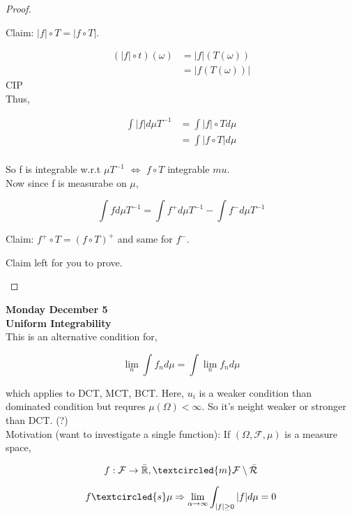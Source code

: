 \documentclass[11pt,fleqn]{book} %
\begin{document}
\begin{proof}
\begin{enumerate}
					Claim: $|f| \circ T = |f \circ T|$. 

							$$\begin{aligned}
								(|f| \circ t)(\omega) &= |f|(T(\omega))\\
									&=|f(T(\omega))|
							\end{aligned} $$
					CIP\\
		Thus, 

				$$\begin{aligned}
					\int |f| d\mu T^{-1} &= \int |f| \circ T d\mu\\
					 &= \int |f\circ T| d\mu\\
				\end{aligned}  $$

		So f is integrable w.r.t $\mu T^{-1}$ $\Leftrightarrow$ $f \circ T$ integrable $mu$. \\
		
		Now since f is measurabe on $\mu$, 


				$$\int f d\mu T^{-1} = \int f^+ d\mu T^{-1} - \int f^- d\mu T^{-1} $$	

						Claim: $f^+ \circ T = (f \circ T)^+$ and same for $f^-$. 

						Claim left for you to prove. 

	\end{enumerate}
\end{proof}

\textbf{Monday December 5}\\

\textbf{Uniform Integrability}\\

This is an alternative condition for, 

		$$\lim_n \int f_n d\mu = \int \lim_n f_n d\mu $$

which applies to DCT, MCT, BCT. Here, $u_i$ is a weaker condition than dominated condition but requres $\mu(\Omega) < \infty$. So it's neight weaker or stronger than DCT. (?)\\

Motivation (want to investigate a single function): If $(\Omega, \mathcal{F}, \mu)$ is a measure space, 

		$$f: \mathcal{F} \rightarrow \bar{\mathbb{R}}, \textcircled{m} \mathcal{F}\setminus \bar{\mathcal{R}} $$

		$$f \textcircled{s} \mu \Rightarrow \lim_{\alpha \rightarrow \infty} \int_{|f| \geq 0} |f| d\mu = 0 $$
\end{document}
